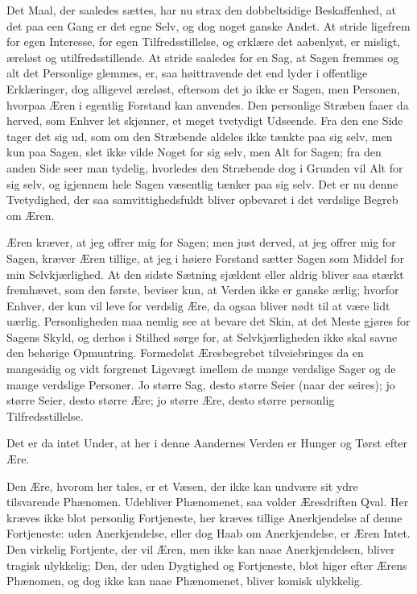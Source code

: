 \documentclass[12pt,a4paper]{book}
\newcommand{\apage}[1]{\marginnote{\footnotesize\textit{[#1]}}}
\begin{document}
Det Maal, der saaledes sættes, har nu strax den dobbeltsidige
Beskaffenhed, at det paa een Gang er det egne Selv, og dog noget ganske
Andet. At stride ligefrem for egen Interesse, for egen Tilfredsstillelse,
og erklære det aabenlyst, er misligt, æreløst og utilfredsstillende. At
stride saaledes for en Sag, at Sagen fremmes og alt det Personlige
glemmes, er, saa høittravende det end lyder i offentlige Erklæringer, dog
alligevel æreløst, eftersom det jo ikke er Sagen, men Personen, hvorpaa
Æren i egentlig Forstand kan anvendes. Den personlige Stræben faaer da
herved, som Enhver let skjønner, et meget tvetydigt Udseende. Fra den ene
Side tager det sig ud, som om den Stræbende aldeles ikke tænkte paa sig
selv, men kun paa Sagen, slet ikke vilde Noget for sig selv, men Alt for
Sagen; fra den anden Side seer man tydelig, hvorledes den Stræbende dog i
Grunden vil Alt for sig selv, og igjennem hele Sagen væsentlig tænker paa
sig \apage{29}
selv. Det er nu denne Tvetydighed, der saa samvittighedsfuldt bliver
opbevaret i det verdslige Begreb om Æren.

Æren kræver, at jeg offrer mig for Sagen; men just derved, at jeg offrer
mig for Sagen, kræver Æren tillige, at jeg i høiere Forstand sætter Sagen
som Middel for min Selvkjærlighed. At den sidste Sætning sjældent eller
aldrig bliver saa stærkt fremhævet, som den første, beviser kun, at Verden
ikke er ganske ærlig; hvorfor Enhver, der kun vil leve for verdslig Ære,
da ogsaa bliver nødt til at være lidt uærlig. Personligheden maa nemlig
see at bevare det Skin, at det Meste gjøres for Sagens Skyld, og derhos i
Stilhed sørge for, at Selvkjærligheden ikke skal savne den behørige
Opmuntring. Formedelst Æresbegrebet tilveiebringes da en mangesidig og
vidt forgrenet Ligevægt imellem de mange verdslige Sager og de mange
verdslige Personer. Jo større Sag, desto større Seier (naar der seires);
jo større Seier, desto større Ære; jo større Ære, desto større personlig
Tilfredsstillelse.

Det er da intet Under, at her i denne Aandernes Verden er Hunger og Tørst
efter Ære.

Den Ære, hvorom her tales, er et Væsen, der ikke kan undvære sit ydre
tilsvarende Phænomen. Udebliver Phænomenet, saa volder Æresdriften Qval.
Her kræves ikke blot personlig Fortjeneste, her kræves tillige
Anerkjendelse af denne Fortjeneste: uden Anerkjendelse, eller dog Haab om
Anerkjendelse, er Æren Intet. Den virkelig Fortjente, der vil Æren, men
ikke kan naae Anerkjendelsen, bliver tragisk ulykkelig; Den, der uden
Dygtighed og Fortjeneste, blot higer efter Ærens Phænomen, og dog ikke kan
naae Phænomenet, bliver komisk ulykkelig.
\end{document}
